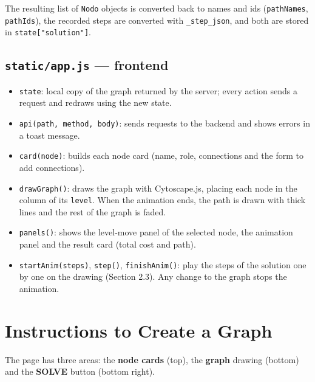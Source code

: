 \documentclass[11pt,letterpaper]{article}
\newcommand{\code}[1]{\texttt{#1}}
\begin{document}
The resulting list of \code{Nodo} objects is converted back to names and ids
(\code{pathNames}, \code{pathIds}), the recorded steps are converted with
\code{\_step\_json}, and both are stored in \code{state["solution"]}.

\subsection{\code{static/app.js} --- frontend}

\begin{itemize}[nosep]
  \item \code{state}: local copy of the graph returned by the server; every
        action sends a request and redraws using the new state.
  \item \code{api(path, method, body)}: sends requests to the backend and
        shows errors in a toast message.
  \item \code{card(node)}: builds each node card (name, role, connections and
        the form to add connections).
  \item \code{drawGraph()}: draws the graph with Cytoscape.js, placing each
        node in the column of its \code{level}. When the animation ends, the path is
        drawn with thick lines and the rest of the graph is faded.
  \item \code{panels()}: shows the level-move panel of the selected node, the
        animation panel and the result card (total cost and path).
  \item \code{startAnim(steps)}, \code{step()}, \code{finishAnim()}: play the
        steps of the solution one by one on the drawing (Section 2.3). Any
        change to the graph stops the animation.
\end{itemize}

\section{Instructions to Create a Graph}

The page has three areas: the \textbf{node cards} (top), the \textbf{graph}
drawing (bottom) and the \textbf{SOLVE} button (bottom right).
\end{document}
